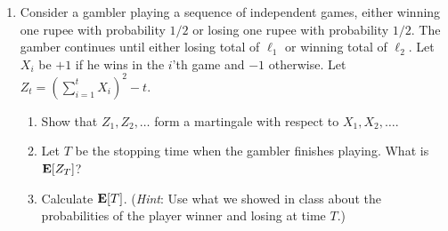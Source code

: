 \documentclass[11pt]{article}
\begin{document}
\begin{enumerate}
\item
Consider a gambler playing a sequence of independent games, either winning one rupee with probability $1/2$ or losing one rupee with probability $1/2$. The gamber continues until either losing total of $\ell_1$ or winning total of $\ell_2$. Let $X_i$ be $+1$ if he wins in the $i$'th game and $-1$ otherwise. Let $Z_t = (\sum_{i=1}^t X_i)^2 - t$. 
\begin{enumerate}
\item
Show that $Z_1, Z_2, \dots$ form a martingale with respect to $X_1, X_2, \dots$.
\item
Let $T$ be the stopping time when the gambler finishes playing. What is $\hbox{\bf E}[Z_T]$?
\item
Calculate $\hbox{\bf E}[T]$. ({\em Hint}: Use what we showed in class about the probabilities of the player winner and losing at time $T$.)
 \end{enumerate}
  

\end{enumerate}
\end{document}
